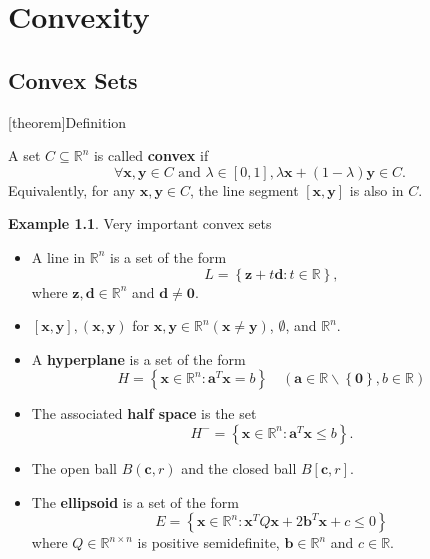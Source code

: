 \documentclass[12pt]{report}
\theoremstyle{definition}
\begin{document}
\chapter{Convexity}

\section{Convex Sets}

[theorem]{Definition}
\begin{convex sets}
    A set $C\subseteq\mathbb{R}^{n}$ is called \textbf{convex} if
    \[
        \forall \mathbf{x},\mathbf{y}\in C\text{ and }\lambda\in[0,1],
        \lambda\mathbf{x}+(1-\lambda)\mathbf{y}\in C.
    \]
    Equivalently, for any $\mathbf{x},\mathbf{y}\in C$, the line segment
    $[\mathbf{x},\mathbf{y}]$ is also in $C$.
\end{convex sets}

\newtheorem{convex sets example}[theorem]{Example}
\begin{convex sets example}
    Very important convex sets
    \begin{itemize}
        \item A line in $\mathbb{R}^{n}$ is a set of the form
            \[
                L=\left\{\mathbf{z}+t\mathbf{d}:t\in\mathbb{R}\right\},
            \]
            where $\mathbf{z},\mathbf{d}\in\mathbb{R}^{n}$ and $\mathbf{d}\neq \mathbf{0}$.
        \item $[\mathbf{x},\mathbf{y}],(\mathbf{x},\mathbf{y})$ for
            $\mathbf{x},\mathbf{y}\in\mathbb{R}^{n}(\mathbf{x}\neq\mathbf{y})$,
            $\emptyset$, and $\mathbb{R}^{n}$.
        \item A \textbf{hyperplane} is a set of the form
            \[
                H=\left\{\mathbf{x}\in\mathbb{R}^{n}:\mathbf{a}^T\mathbf{x}=b\right\}\quad
                (\mathbf{a}\in\mathbb{R}\backslash\left\{\mathbf{0}\right\},b\in\mathbb{R})
            \]
        \item The associated \textbf{half space} is the set
            \[
                H^-=\left\{\mathbf{x}\in\mathbb{R}^{n}:\mathbf{a}^T\mathbf{x}\le b\right\}.
            \]
        \item The open ball $B(\mathbf{c},r)$ and the closed ball $B[\mathbf{c},r]$.
        \item The \textbf{ellipsoid} is a set of the form
            \[
                E=\left\{\mathbf{x}\in\mathbb{R}^{n}:\mathbf{x}^TQ\mathbf{x}+2\mathbf{b}^T\mathbf{x}+c\le 0\right\}
            \]
            where $Q\in\mathbb{R}^{n\times n}$ is positive semidefinite,
            $\mathbf{b}\in\mathbb{R}^{n}$ and $c\in\mathbb{R}$.
    \end{itemize} 
\end{convex sets example}
\end{document}

